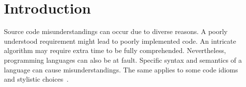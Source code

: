 \section{Introduction}
\label{intro}




Source code misunderstandings can occur due to diverse reasons.
A poorly understood requirement might lead to poorly implemented code.
An intricate algorithm may require extra time to be fully comprehended.
Nevertheless, programming languages can also be at fault.
Specific syntax and semantics of a language can cause misunderstandings. The same applies to some code idioms and stylistic choices~\cite{DBLP:conf/msr/GopsteinZFC18}.

